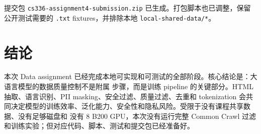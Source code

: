\documentclass[UTF8,11pt]{ctexart}
\begin{document}
提交包 \texttt{cs336-assignment4-submission.zip} 已生成。打包脚本也已调整，保留公开测试需要的
\texttt{.txt} fixtures，并排除本地 \texttt{local-shared-data/*}。

\section{结论}

本次 Data assignment 已经完成本地可实现和可测试的全部阶段。核心结论是：大语言模型的数据质量控制不是附属
步骤，而是训练 pipeline 的关键部分。HTML 抽取、语言识别、PII masking、安全过滤、质量过滤、去重和
tokenization 会共同决定模型的训练效率、泛化能力、安全性和隐私风险。受限于没有课程共享数据、没有足够磁盘和
没有 8 B200 GPU，本次没有运行完整 Common Crawl 过滤和训练实验；但对应代码、脚本、测试和提交包已经准备好。
\end{document}
